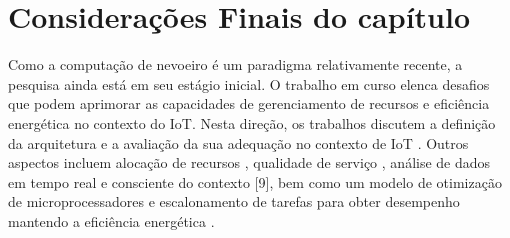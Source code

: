 \section{Considerações Finais do capítulo}

\begin{table*}
\centering
\caption{Visão geral de alguns aspectos da revisão bibliográfica}
\label{my-label}
\end{table*}

Como a computação de nevoeiro é um paradigma relativamente recente, a pesquisa ainda está em seu estágio inicial. O trabalho em curso elenca desafios que podem aprimorar as capacidades de gerenciamento de recursos e eficiência energética no contexto do IoT. Nesta direção, os trabalhos discutem a definição da arquitetura \cite{sarkar2016theoretical} e a avaliação da sua adequação no contexto de IoT \cite{gupta2016ifogsim}. Outros aspectos incluem alocação de recursos \cite{kaur2017container}, qualidade de serviço \cite{suto2015energy}, análise de dados em tempo real e consciente do contexto [9], bem como um modelo de otimização de microprocessadores \cite{nassiffe2016optimising} e escalonamento de tarefas para obter desempenho mantendo a eficiência energética \cite{zahaf2017energy}.

